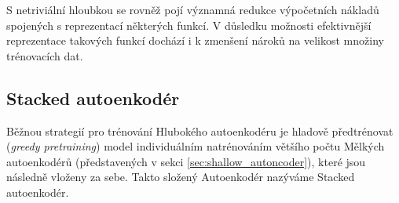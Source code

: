 S netriviální hloubkou se rovněž pojí významná redukce výpočetních nákladů spojených s reprezentací některých funkcí. 
V důsledku možnosti efektivnější reprezentace takových funkcí dochází i k zmenšení nároků na velikost množiny trénovacích dat.

\subsection{Stacked autoenkodér}
\label{sec:stacked_autoencoder}
Běžnou strategií pro trénování Hlubokého autoenkodéru je hladově předtrénovat (\emph{greedy pretraining}) model individuálním natrénováním většího počtu Mělkých autoenkodérů (představených v sekci \autoref{sec:shallow_autoncoder}), které jsou následně vloženy za sebe.
Takto složený Autoenkodér nazýváme Stacked autoenkodér. \cite{Geron2019}